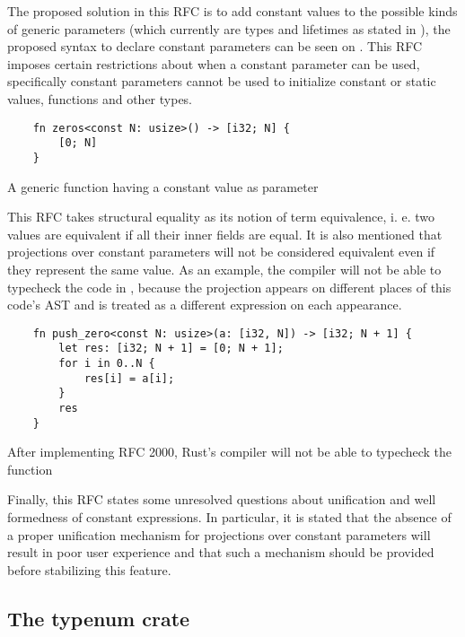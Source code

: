The proposed solution in this RFC is to add constant values to the possible
kinds of generic parameters (which currently are types and lifetimes as stated
in ), the proposed syntax to declare constant
parameters can be seen on . This RFC imposes
certain restrictions about when a constant parameter can be used, specifically
constant parameters cannot be used to initialize constant or static values,
functions and other types.

\begin{listing}[ht]
	\begin{verbatim}
    fn zeros<const N: usize>() -> [i32; N] {
        [0; N]
    }
	\end{verbatim}
    \caption{A generic function having a constant value as parameter}
  \label{lst:const_generics}
\end{listing}

This RFC takes structural equality as its notion of term equivalence, i. e. two
values are equivalent if all their inner fields are equal. It is also mentioned
that projections over constant parameters will not be considered equivalent even
if they represent the same value. As an example, the compiler will not be able
to typecheck the code in , because the
projection  appears on different places of this code's AST and is
treated as a different expression on each appearance.

\begin{listing}[ht]
	\begin{verbatim}
    fn push_zero<const N: usize>(a: [i32, N]) -> [i32; N + 1] {
        let res: [i32; N + 1] = [0; N + 1];
        for i in 0..N {
            res[i] = a[i];
        }
        res
    }
	\end{verbatim}
  \caption{After implementing RFC 2000, Rust's compiler will not be able to
  typecheck the function }
  \label{lst:uncheckable_code}
\end{listing}

Finally, this RFC states some unresolved questions about unification and well
formedness of constant expressions. In particular, it is stated that the absence
of a proper unification mechanism for projections over constant parameters will
result in poor user experience and that such a mechanism should be provided
before stabilizing this feature.

\subsection{The typenum crate}


